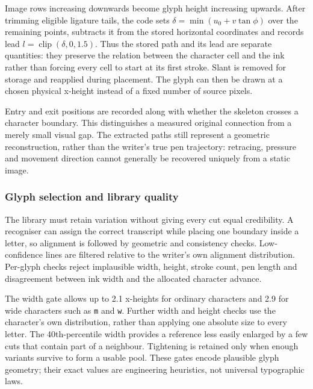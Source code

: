 Image rows increasing downwards become glyph height increasing upwards. After trimming eligible ligature tails, the code sets $\delta=\min(u_0+v\tan\phi)$ over the remaining points, subtracts it from the stored horizontal coordinates and records lead $l=\operatorname{clip}(\delta,0,1.5)$. Thus the stored path and its lead are separate quantities: they preserve the relation between the character cell and the ink rather than forcing every cell to start at its first stroke. Slant is removed for storage and reapplied during placement. The glyph can then be drawn at a chosen physical x-height instead of a fixed number of source pixels.~\cite[style.py; synthesise.py; reproduce.py]{braunepipeline2026}

Entry and exit positions are recorded along with whether the skeleton crosses a character boundary. This distinguishes a measured original connection from a merely small visual gap. The extracted paths still represent a geometric reconstruction, rather than the writer's true pen trajectory: retracing, pressure and movement direction cannot generally be recovered uniquely from a static image.~\cite[project records; implementation]{brauneevidence2026,braunepipeline2026}

\subsubsection{Glyph selection and library quality}
The library must retain variation without giving every cut equal credibility. A recogniser can assign the correct transcript while placing one boundary inside a letter, so alignment is followed by geometric and consistency checks. Low-confidence lines are filtered relative to the writer's own alignment distribution. Per-glyph checks reject implausible width, height, stroke count, pen length and disagreement between ink width and the allocated character advance.~\cite[style.py; synthesise.py; reproduce.py]{braunepipeline2026}


The width gate allows up to 2.1 x-heights for ordinary characters and 2.9 for wide characters such as \texttt{m} and \texttt{w}. Further width and height checks use the character's own distribution, rather than applying one absolute size to every letter. The 40th-percentile width provides a reference less easily enlarged by a few cuts that contain part of a neighbour. Tightening is retained only when enough variants survive to form a usable pool. These gates encode plausible glyph geometry; their exact values are engineering heuristics, not universal typographic laws.~\cite[style.py; synthesise.py; reproduce.py]{braunepipeline2026}

